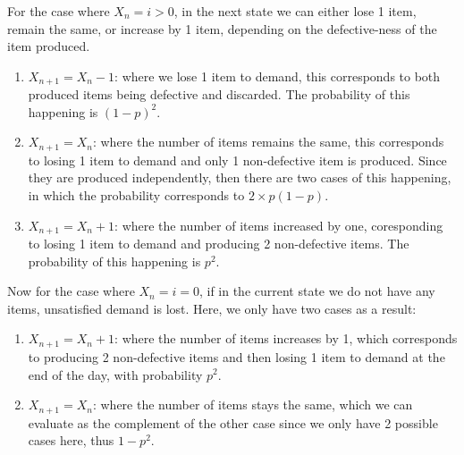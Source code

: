 \documentclass[12pt]{article}
\begin{document}
\noindent For the case where $X_n = i > 0$, in the next state we can either lose 1 item, remain the same, or increase by 1 item, depending on the defective-ness of the item produced. \begin{enumerate}
    \item $X_{n+1} = X_n - 1$: where we lose 1 item to demand, this corresponds to both produced items being defective and discarded. The probability of this happening is $(1-p)^{2}$. 
    \item $X_{n+1} = X_n$: where the number of items remains the same, this corresponds to losing 1 item to demand and only 1 non-defective item is produced. Since they are produced independently, then there are two cases of this happening, in which the probability corresponds to $2 \times p(1-p)$. 
    \item $X_{n+1} = X_n + 1$: where the number of items increased by one, coresponding to losing 1 item to demand and producing 2 non-defective items. The probability of this happening is $p^{2}$. 
\end{enumerate} 

\noindent Now for the case where $X_n = i = 0$, if in the current state we do not have any items, unsatisfied demand is lost. Here, we only have two cases as a result: \begin{enumerate}
    \item $X_{n+1} = X_n + 1$: where the number of items increases by 1, which corresponds to producing 2 non-defective items and then losing 1 item to demand at the end of the day, with probability $p^{2}$.
    \item $X_{n+1} = X_n$: where the number of items stays the same, which we can evaluate as the complement of the other case since we only have 2 possible cases here, thus $1 - p^{2}$.
\end{enumerate}
\end{document}
